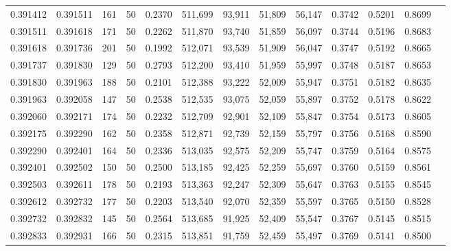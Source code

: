 \begin{tabular}{rrrrrrrrrrrrr}
0.391412 & 0.391511 &   161 &  50 &                                     0.2370 & 511,699 &  93,911 &  51,809 &  56,147 & 0.3742 & 0.5201 & 0.8699 \\
0.391511 & 0.391618 &   171 &  50 &                                     0.2262 & 511,870 &  93,740 &  51,859 &  56,097 & 0.3744 & 0.5196 & 0.8683 \\
0.391618 & 0.391736 &   201 &  50 &                                     0.1992 & 512,071 &  93,539 &  51,909 &  56,047 & 0.3747 & 0.5192 & 0.8665 \\
0.391737 & 0.391830 &   129 &  50 &                                     0.2793 & 512,200 &  93,410 &  51,959 &  55,997 & 0.3748 & 0.5187 & 0.8653 \\
0.391830 & 0.391963 &   188 &  50 &                                     0.2101 & 512,388 &  93,222 &  52,009 &  55,947 & 0.3751 & 0.5182 & 0.8635 \\
0.391963 & 0.392058 &   147 &  50 &                                     0.2538 & 512,535 &  93,075 &  52,059 &  55,897 & 0.3752 & 0.5178 & 0.8622 \\
0.392060 & 0.392171 &   174 &  50 &                                     0.2232 & 512,709 &  92,901 &  52,109 &  55,847 & 0.3754 & 0.5173 & 0.8605 \\
0.392175 & 0.392290 &   162 &  50 &                                     0.2358 & 512,871 &  92,739 &  52,159 &  55,797 & 0.3756 & 0.5168 & 0.8590 \\
0.392290 & 0.392401 &   164 &  50 &                                     0.2336 & 513,035 &  92,575 &  52,209 &  55,747 & 0.3759 & 0.5164 & 0.8575 \\
0.392401 & 0.392502 &   150 &  50 &                                     0.2500 & 513,185 &  92,425 &  52,259 &  55,697 & 0.3760 & 0.5159 & 0.8561 \\
0.392503 & 0.392611 &   178 &  50 &                                     0.2193 & 513,363 &  92,247 &  52,309 &  55,647 & 0.3763 & 0.5155 & 0.8545 \\
0.392612 & 0.392732 &   177 &  50 &                                     0.2203 & 513,540 &  92,070 &  52,359 &  55,597 & 0.3765 & 0.5150 & 0.8528 \\
0.392732 & 0.392832 &   145 &  50 &                                     0.2564 & 513,685 &  91,925 &  52,409 &  55,547 & 0.3767 & 0.5145 & 0.8515 \\
0.392833 & 0.392931 &   166 &  50 &                                     0.2315 & 513,851 &  91,759 &  52,459 &  55,497 & 0.3769 & 0.5141 & 0.8500 \\

\end{tabular}
